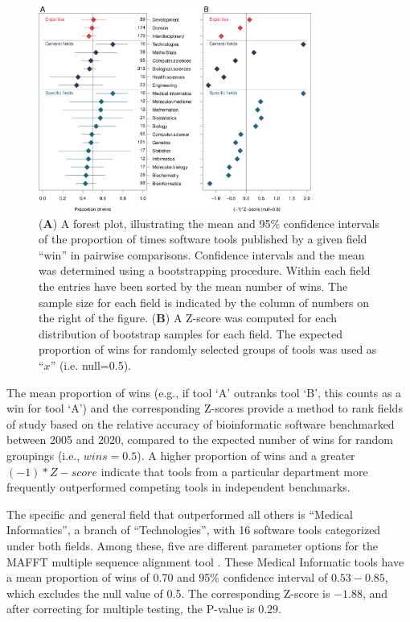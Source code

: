 \documentclass[fleqn,10pt,doc,onecolumn]{SelfArx}%
\begin{document}
\begin{figure}[ht!]
\begin{center}
  \includegraphics[width=0.8\textwidth]{forest-z-Plot.pdf}
\end{center}
\caption{(\textbf{A}) A forest plot, illustrating the mean and 95\%
  confidence intervals of the proportion of times software tools
  published by a given field ``win'' in pairwise
  comparisons. Confidence intervals and the mean was determined using
  a bootstrapping procedure. Within each field the entries have been
  sorted by the mean number of wins. The sample size for each field is
  indicated by the column of numbers on the right of the figure.
  (\textbf{B}) A Z-score was computed for each distribution of
  bootstrap samples for each field. The expected proportion of wins
  for randomly selected groups of tools was used as ``$x$''
  (i.e. null=0.5).}
\label{fig:fig2}
\end{figure}

The mean proportion of wins (e.g., if tool `A' outranks tool `B', this
counts as a win for tool `A') and the corresponding Z-scores provide a
method to rank fields of study based on the relative accuracy of
bioinformatic software benchmarked between 2005 and 2020, compared to
the expected number of wins for random groupings (i.e., $wins =
0.5$). A higher proportion of wins and a greater $(-1) * Z-score$
indicate that tools from a particular department more frequently
outperformed competing tools in independent benchmarks.

The specific and general field that outperformed all others is
``Medical Informatics'', a branch of ``Technologies'', with 16
software tools categorized under both fields. Among these, five are
different parameter options for the MAFFT multiple sequence alignment
tool \cite{katoh2008recent}.  These Medical Informatic tools have a mean proportion of wins of
0.70 and 95\% confidence interval of $0.53-0.85$, which excludes the
null value of 0.5. The corresponding Z-score is $-1.88$, and after correcting for multiple testing, the P-value is $0.29$.
\end{document}
